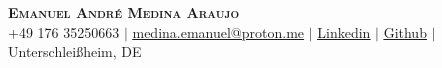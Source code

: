 \begin{center}
    \textbf{\Huge \scshape Emanuel André Medina Araujo} \\ \vspace{1pt}
    \small 
    +49 176 35250663 $|$
    \href{mailto:medina.emanuel@proton.me}{\underline{medina.emanuel@proton.me}} $|$ 
    \href{https://linkedin.com/in/emanuel-medina-araujo}{\underline{Linkedin}} $|$ 
    \href{https://github.com/EmanuelMedinaAraujo}{\underline{Github}} $|$
    Unterschleißheim, DE
\end{center}